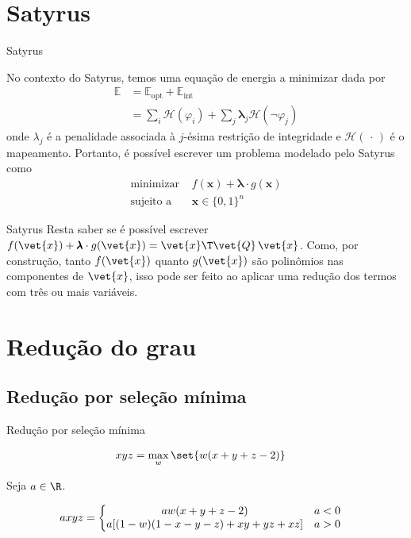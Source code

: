 \documentclass[brazil, MathSerif, aspectratio = 169]{beamer}
\begin{document}
\section{Satyrus}

\begin{frame}{Satyrus}

    No contexto do Satyrus, temos uma equação de energia a minimizar dada por
        \begin{align*}
            \mathbb{E} &= \mathbb{E}_\text{opt} + \mathbb{E}_\text{int}\\
                       &= \sum_{i} \mathcal{H} \left( \varphi_i \right) %
                       + \sum_j \pmb{\lambda}_j \mathcal{H} \left( \neg \varphi_j \right)
        \end{align*}
    onde $\lambda_j$ é a penalidade associada à $j$-ésima restrição de integridade e $\mathcal{H} \left(\,\cdot\,\right)$ é o mapeamento. Portanto, é possível escrever um problema modelado pelo Satyrus como
        \begin{align*}
            \text{minimizar } &f(\mathbf{x}) + \pmb{\lambda} \cdot g(\mathbf{x})\\
            \text{sujeito a } &\mathbf{x} \in \{0, 1\}^{n}
        \end{align*}
\end{frame}

\begin{frame}{Satyrus}%
    Resta saber se é possível escrever
        $f(\vet{x}) + \pmb{\lambda} \cdot g(\vet{x}) = \vet{x}\T \vet{Q}\, \vet{x}$.
    Como, por construção, tanto $f(\vet{x})$ quanto $g(\vet{x})$ são polinômios nas componentes de $\vet{x}$, isso pode ser feito ao aplicar uma redução dos termos com três ou mais variáveis.
    
    
\end{frame}

\section{Redução do grau}
\SectionPage

\subsection{Redução por seleção mínima}
\begin{frame}{Redução por seleção mínima\cite{dwave:2016}}

    \begin{align*}
        x y z &= \max_{w} \set{w (x + y + z - 2)}
    \end{align*}

    Seja $a \in \R$.

    \begin{align*}
        a x y z &= \left\{ \begin{array}{@{}c l@{}}
            a w (x + y + z - 2) & a < 0\\
            a [ (1 - w) (1 - x - y - z) +%
            x y + y z + x z] & a > 0
        \end{array} \right.
    \end{align*}
\end{frame}
\end{document}
